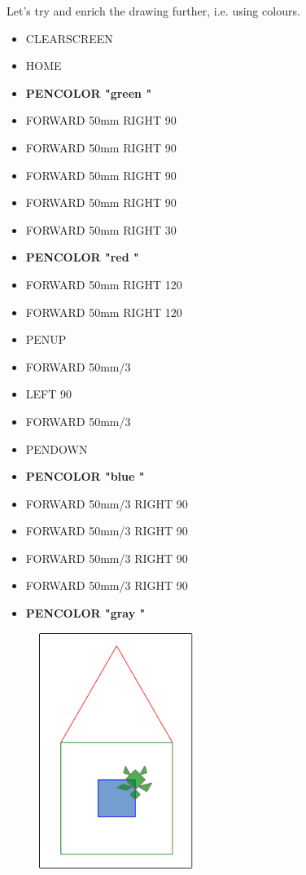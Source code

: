 \vskip 1cm

Let's try and enrich the drawing further, i.e. using colours.
  

\vskip 1cm

\begin{scriptsize}
\begin{minipage}{0.40\textwidth}
\begin{itemize}[itemsep=-3pt,parsep=2pt]
\item[] CLEARSCREEN             
\item[] HOME
\item[] \textbf{PENCOLOR  "green "}
\item[] FORWARD 50mm RIGHT 90
\item[] FORWARD 50mm RIGHT 90
\item[] FORWARD 50mm RIGHT 90
\item[] FORWARD 50mm RIGHT 90
\item[] FORWARD 50mm RIGHT 30
\item[] \textbf{PENCOLOR  "red "}
\item[] FORWARD 50mm RIGHT 120
\item[] FORWARD 50mm RIGHT 120
\item[] PENUP
\item[] FORWARD 50mm/3
\item[] LEFT 90
\item[] FORWARD 50mm/3
\item[] PENDOWN
\item[] \textbf{PENCOLOR  "blue "}
\item[] FORWARD 50mm/3 RIGHT 90
\item[] FORWARD 50mm/3 RIGHT 90
\item[] FORWARD 50mm/3 RIGHT 90
\item[] FORWARD 50mm/3 RIGHT 90
\item[] \textbf{PENCOLOR  "gray "}
\end{itemize}
\end{minipage}
\end{scriptsize}
\begin{minipage}{0.4\textwidth}
\begin{figure}[H]
   \includegraphics[width=5.0cm,trim=4 4 8 4,clip]{./images/disegnare/disegnare-10.png}
   \label{dis-10}
\end{figure}
\end{minipage} \hfill


